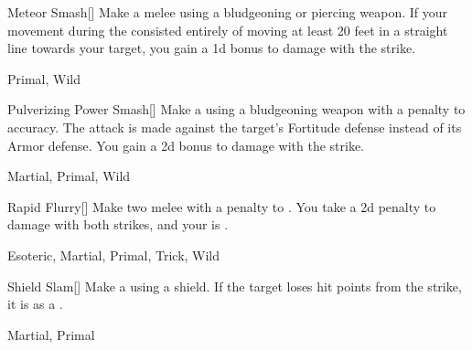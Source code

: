 \lowercase{\hypertarget{maneuver:Meteor Smash}{}}\label{maneuver:Meteor Smash}
\hypertarget{maneuver:Meteor Smash}{}
\begin{freeability}[Rank 3]{Meteor Smash}[]
Make a melee  using a bludgeoning or piercing weapon.
If your movement during the  consisted entirely of moving at least 20 feet in a straight line towards your target, you gain a \plus1d bonus to damage with the strike.


 Primal, Wild
\end{freeability}
\vspace{0.25em}



\lowercase{\hypertarget{maneuver:Pulverizing Power Smash}{}}\label{maneuver:Pulverizing Power Smash}
\hypertarget{maneuver:Pulverizing Power Smash}{}
\begin{freeability}[Rank 3]{Pulverizing Power Smash}[]
Make a  using a bludgeoning weapon with a  penalty to accuracy.
The attack is made against the target's Fortitude defense instead of its Armor defense.
You gain a \plus2d bonus to damage with the strike.


 Martial, Primal, Wild
\end{freeability}
\vspace{0.25em}



\lowercase{\hypertarget{maneuver:Rapid Flurry}{}}\label{maneuver:Rapid Flurry}
\hypertarget{maneuver:Rapid Flurry}{}
\begin{freeability}[Rank 3]{Rapid Flurry}[]
Make two melee  with a  penalty to .
You take a \minus2d penalty to damage with both strikes, and your  is .


 Esoteric, Martial, Primal, Trick, Wild
\end{freeability}
\vspace{0.25em}



\lowercase{\hypertarget{maneuver:Shield Slam}{}}\label{maneuver:Shield Slam}
\hypertarget{maneuver:Shield Slam}{}
\begin{freeability}[Rank 3]{Shield Slam}[]
Make a  using a shield.
If the target loses hit points from the strike, it is  as a .


 Martial, Primal
\end{freeability}
\vspace{0.25em}



